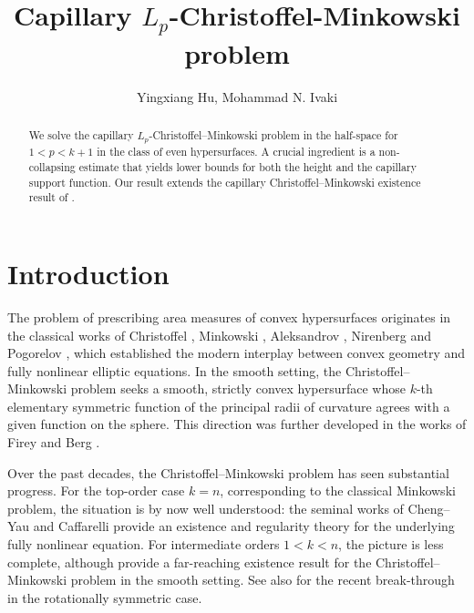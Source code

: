 \documentclass[12pt]{amsart}
\numberwithin{equation}{section}
\newcommand{\8}{\infty}
\begin{document}
\title{Capillary $L_p$-Christoffel-Minkowski problem}
	\author[Y. Hu, M. N. Ivaki]{Yingxiang Hu, Mohammad N. Ivaki}

\begin{abstract}
We solve the capillary $L_p$-Christoffel--Minkowski problem in the half-space for $1<p<k+1$ in the class of even hypersurfaces. A crucial ingredient is a non-collapsing estimate that yields lower bounds for both the height and the capillary support function. Our result extends the capillary Christoffel--Minkowski existence result of \cite{HIS25}.
\end{abstract}

\maketitle

\section{Introduction}
The problem of prescribing area measures of convex hypersurfaces originates in the classical works of Christoffel \cite{Chr65}, Minkowski \cite{Min97,Min03}, Aleksandrov \cite{Ale56}, Nirenberg \cite{Nir57} and Pogorelov \cite{Pog52,Pog71}, which established the modern interplay between convex geometry and fully nonlinear elliptic equations. In the smooth setting, the Christoffel--Minkowski problem seeks a smooth, strictly convex hypersurface whose $k$-th elementary symmetric function of the principal radii of curvature agrees with a given function on the sphere. This direction was further developed in the works of Firey and Berg \cite{Fir67,Fir70,Ber69}.

Over the past decades, the Christoffel--Minkowski problem has seen substantial progress. For the top-order case $k=n$, corresponding to the classical Minkowski problem, the situation is by now well understood: the seminal works of Cheng--Yau \cite{CY76} and Caffarelli \cite{Caf90a,Caf90b} provide an existence and regularity theory for the underlying fully nonlinear equation. For intermediate orders $1< k<n$, the picture is less complete, although \cite{GM03,STW04} provide a far-reaching existence result for the Christoffel--Minkowski problem in the smooth setting. See also \cite{BHOM25,MU25} for the recent break-through in the rotationally symmetric case. 
\end{document}
